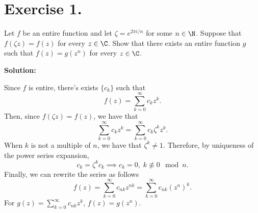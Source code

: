 \section*{Exercise 1.}

Let $f$ be an entire function and let $\zeta = e^{2\pi i / n}$ for some $n \in \N$. Suppose that $f(\zeta z) = f(z)$ for every $z \in\C$. Show that there exists an entire function $g$ such that $f(z) = g(z^n)$ for every $z\in \C$.

\textbf{Solution:}

Since $f$ is entire, there's exists $\{c_k\}$ such that 
\[ f(z) = \sum_{k = 0}^{\infty} c_k z^k. \]
Then, since $f(\zeta z) = f(z)$, we have that
\[ \sum_{k = 0}^{\infty} c_k z^k = \sum_{k = 0}^{\infty} c_k \zeta^k z^k. \]
When $k$ is not a multiple of $n$, we have that $\zeta^k \neq 1$. Therefore, by uniqueness of the power series expansion,
\[ c_k = \zeta^k c_k \implies c_k = 0,\; k\not\equiv 0 \mod n. \]
Finally, we can rewrite the series as follows
\[ f(z) = \sum_{k = 0}^{\infty} c_{nk} z^{nk} = \sum_{k = 0}^{\infty} c_{nk} (z^{n})^k. \]
For $g(z) = \sum_{k = 0}^{\infty} c_{nk} z^k$, $f(z) = g(z^n)$.